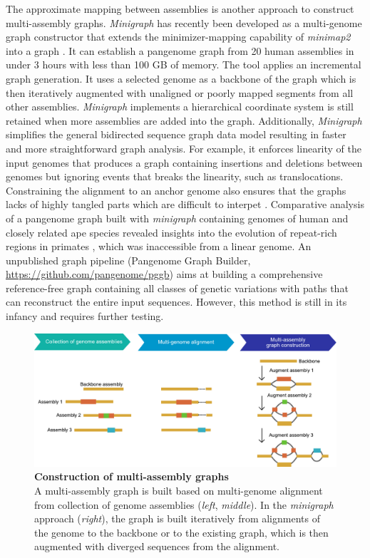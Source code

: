 \documentclass[../main.tex]{subfiles}
\begin{document}
The approximate mapping between assemblies is another approach to construct multi-assembly graphs. \emph{Minigraph} \citep{li2020design} has recently been developed as a multi-genome graph constructor that extends the minimizer-mapping capability of \emph{minimap2} into a graph \citep{li2018minimap2}. It can establish a pangenome graph from 20 human assemblies in under 3 hours with less than 100 GB of memory. The tool applies an incremental graph generation. It uses  a selected genome as a backbone of the graph which is then iteratively augmented with unaligned or poorly mapped segments from all other assemblies. \emph{Minigraph} implements a hierarchical coordinate system is still retained when more assemblies are added into the graph. 
Additionally, \emph{Minigraph} simplifies the general bidirected sequence graph data model resulting in faster and more straightforward graph analysis. For example, it enforces linearity of the input genomes that produces a graph containing insertions and deletions between genomes but ignoring events that breaks the linearity, such as translocations. Constraining the alignment to an anchor genome also ensures that the graphs lacks of highly tangled parts which are difficult to interpet \citep{Lei2021}. Comparative analysis of a pangenome graph built with \emph{minigraph} containing genomes of human and closely related ape species revealed insights into the evolution of repeat-rich regions in primates \citep{li2020design}, which was inaccessible from a linear genome. An unpublished graph pipeline (Pangenome Graph Builder, \url{https://github.com/pangenome/pggb}) aims at building a comprehensive reference-free graph containing all classes of genetic variations with paths that can reconstruct the entire input sequences. However, this method is still in its infancy and requires further testing. \\

\begin{figure}[!htb]
    \centering
    \includegraphics[width=\textwidth]{intro/fig7.pdf}
        \vspace{3mm}
        \caption[Construction of multi-assembly graphs]{\textbf{Construction of multi-assembly graphs} \\
        \footnotesize{A multi-assembly graph is built based on multi-genome alignment from collection of genome assemblies (\emph{left}, \emph{middle}). In the \emph{minigraph} approach (\emph{right}), the graph is built iteratively from alignments of the genome to the backbone or to the existing graph, which is then augmented with diverged sequences from the alignment.}}
        \label{fig17:multi}
\end{figure}
\end{document}
